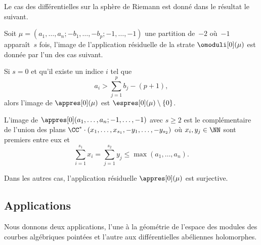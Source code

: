 Le cas des différentielles sur la sphère de Riemann est donné dans le résultat le suivant.
\begin{thm}\label{thm:geq0keq1}
Soit $\mu=(a_{1},\dots,a_{n};-b_{1},\dots,-b_{p};-1,\dots,-1)$ une partition de~$-2$ où~$-1$ apparaît~$s$ fois, l'image de l'application résiduelle de la strate $\omoduli[0](\mu)$ est donnée par l'un des cas suivant.
\begin{enumeratei}
\item\label{thm:geq0keq1i} Si $s=0$ et qu'il existe un indice $i$ tel que
\begin{equation}\label{eq:genrezeroresiduzerofr}
a_{i}>\sum_{j=1}^{p}b_{j}-(p+1),
\end{equation}
alors l'image de $\appres[0](\mu)$ est $\espres[0](\mu)\setminus\left\{0\right\}$.
\item\label{thm:geq0keq1ii} L'image de $\appres[0](a_{1},\dots,a_{n};-1,\dots,-1)$ avec $s\geq2$ est le complémentaire de l'union des plans $\CC^{\ast} \cdot (x_{1},\dots,x_{s_{1}},-y_{1},\dots,-y_{s_{2}})$ où $x_{i},y_{j} \in \NN$ sont premiers entre eux et
\begin{equation}\label{eq:polessimples}
\sum_{i=1}^{s_{1}} x_{i} = \sum_{j=1}^{s_{2}} y_{j} \leq \max(a_{1},\dots,a_{n}).
\end{equation}
\item\label{thm:geq0keq1iii} Dans les autres cas, l'application résiduelle $\appres[0](\mu)$ est surjective.
\end{enumeratei}
\end{thm}

\subsection{Applications}
\label{sec:apliintro}

Nous donnons deux applications, l'une à la géométrie de l'espace des modules des courbes algébriques pointées et l'autre aux différentielles abéliennes holomorphes.
